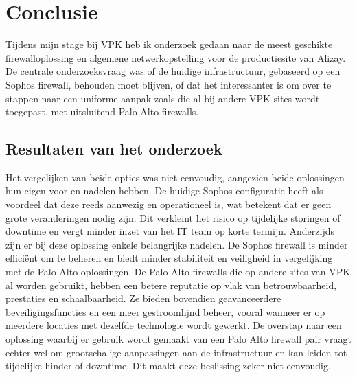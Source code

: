 
\chapter{Conclusie}%
\label{ch:conclusie}




Tijdens mijn stage bij VPK heb ik onderzoek gedaan naar de meest geschikte firewalloplossing en algemene netwerkopstelling voor de productiesite van Alizay. De centrale onderzoeksvraag was of de huidige infrastructuur, gebaseerd op een Sophos firewall, behouden moet blijven, of dat het interessanter is om over te stappen naar een uniforme aanpak zoals die al bij andere VPK-sites wordt toegepast, met uitsluitend Palo Alto firewalls.

\section{Resultaten van het onderzoek}
Het vergelijken van beide opties was niet eenvoudig, aangezien beide oplossingen hun eigen voor en nadelen hebben. De huidige Sophos configuratie heeft als voordeel dat deze reeds aanwezig en operationeel is, wat betekent dat er geen grote veranderingen nodig zijn. Dit verkleint het risico op tijdelijke storingen of downtime en vergt minder inzet van het IT team op korte termijn. Anderzijds zijn er bij deze oplossing enkele belangrijke nadelen. De Sophos firewall is minder efficiënt om te beheren en biedt minder stabiliteit en veiligheid in vergelijking met de Palo Alto oplossingen.
De Palo Alto firewalls die op andere sites van VPK al worden gebruikt, hebben een betere reputatie op vlak van betrouwbaarheid, prestaties en schaalbaarheid. Ze bieden bovendien geavanceerdere beveiligingsfuncties en een meer gestroomlijnd beheer, vooral wanneer er op meerdere locaties met dezelfde technologie wordt gewerkt. De overstap naar een oplossing waarbij er gebruik wordt gemaakt van een Palo Alto firewall pair vraagt echter wel om grootschalige aanpassingen aan de infrastructuur en kan leiden tot tijdelijke hinder of downtime. Dit maakt deze beslissing zeker niet eenvoudig.


